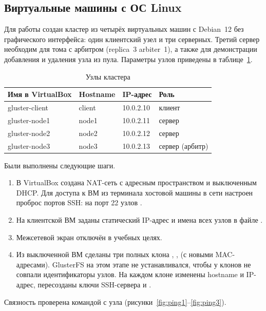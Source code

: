 \subsection{Виртуальные машины с ОС Linux}

Для работы создан кластер из четырёх виртуальных машин с Debian~12 без графического интерфейса: один клиентский узел и три серверных. Третий сервер необходим для тома с арбитром (replica~3 arbiter~1), а также для демонстрации добавления и удаления узла из пула. Параметры узлов приведены в таблице~\ref{tab:nodes}.

\begin{table}[H]
\centering
\caption{Узлы кластера}\label{tab:nodes}
\begin{tabular}{llll}
\toprule
Имя в VirtualBox & Hostname & IP-адрес & Роль \\
\midrule
gluster-client & client & 10.0.2.10 & клиент \\
gluster-node1  & node1  & 10.0.2.11 & сервер \\
gluster-node2  & node2  & 10.0.2.12 & сервер \\
gluster-node3  & node3  & 10.0.2.13 & сервер (арбитр) \\
\bottomrule
\end{tabular}
\end{table}

Были выполнены следующие шаги.

\begin{enumerate}
  \item В VirtualBox создана NAT-сеть  с адресным пространством  и выключенным DHCP. Для доступа к ВМ из терминала хостовой машины в сети настроен проброс портов SSH:  на порт 22 узлов .
  \item На клиентской ВМ заданы статический IP-адрес и имена всех узлов в файле .
  \item Межсетевой экран отключён в учебных целях.
  \item Из выключенной ВМ  сделаны три полных клона , ,  (с новыми MAC-адресами). GlusterFS на этом этапе не устанавливался, чтобы у клонов не совпали идентификаторы узлов. На каждом клоне изменены hostname и IP-адрес, пересозданы ключи SSH-сервера и .
\end{enumerate}

Связность проверена командой  с узла  (рисунки~\ref{fig:ping1}--\ref{fig:ping3}).

